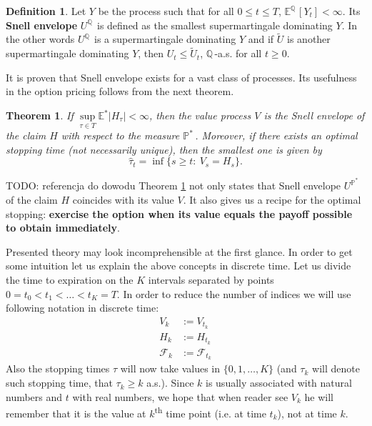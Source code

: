\documentclass[a4paper,11pt, twoside]{book}
\newtheorem{thm}{Theorem}[chapter]
\theoremstyle{definition}
\newtheorem{mydef}{Definition}[chapter]
\theoremstyle{remark}
\def\E{{\mathbb{E}}}
\def\Q{{\mathbb{Q}}\,}
\def\Em{{\mathbb{E}^*}}
\def\Pm{{\mathbb{P}}^*\,}
\begin{document}
\begin{mydef}
 Let $Y$ be the process such that for all $0 \leq t \leq T$, $\E^{\Q}[Y_t] < \infty$. Its \textbf{Snell envelope} $U^{\Q}$ is defined as the smallest supermartingale dominating $Y$. In the other words $U^{\Q}$ is a supermartingale dominating $Y$ and if $\tilde{U}$ is another supermartingale dominating $Y$, then $U_t \leq \tilde{U}_t$, $\Q$-a.s. for all $t \geq 0$.
\end{mydef}
It is proven that Snell envelope exists for a vast class of processes. Its usefulness in the option pricing follows from the next theorem.
\begin{thm}
 \label{thm:snell}
 If $\sup\limits_{\tau \in T} \Em|H_{\tau}| < \infty$, then the value process $V$ is the Snell envelope of the claim $H$ with respect to the measure $\Pm$. Moreover, if there exists an optimal stopping time (not necessarily unique), then the smallest one is given by
 \begin{equation}
  \label{eq:optStop}
  \hat{\tau}_t = \inf\{ s \geq t:\ V_s = H_s \}.
 \end{equation}
\end{thm}
{\LARGE \color{red} TODO: referencja do dowodu}
Theorem \ref{thm:snell} not only states that Snell envelope $U^{\Pm}$ of the claim $H$ coincides with its value $V$. It also gives us a recipe for the optimal stopping: \textbf{exercise the option when its value equals the payoff possible to obtain immediately}.

Presented theory may look incomprehensible at the first glance. In order to get some intuition let us explain the above concepts in discrete time. Let us divide the time to expiration on the $K$ intervals separated by points $0 = t_0 < t_1 < \ldots < t_K = T$. In order to reduce the number of indices we will use following notation in discrete time:
\begin{align*}
 V_k &:= V_{t_k} \\
 H_k &:= H_{t_k} \\
 \mathcal{F}_k &:= \mathcal{F}_{t_k}
\end{align*}
Also the stopping times $\tau$ will now take values in $\{0, 1, \ldots, K\}$ (and $\tau_k$ will denote such stopping time, that $\tau_k \geq k$ a.s.).
Since $k$ is usually associated with natural numbers and $t$ with real numbers, we hope that when reader see $V_k$ he will remember that it is the value at $k$\textsuperscript{th} time point (i.e. at time $t_k$), not at time $k$.
\end{document}
